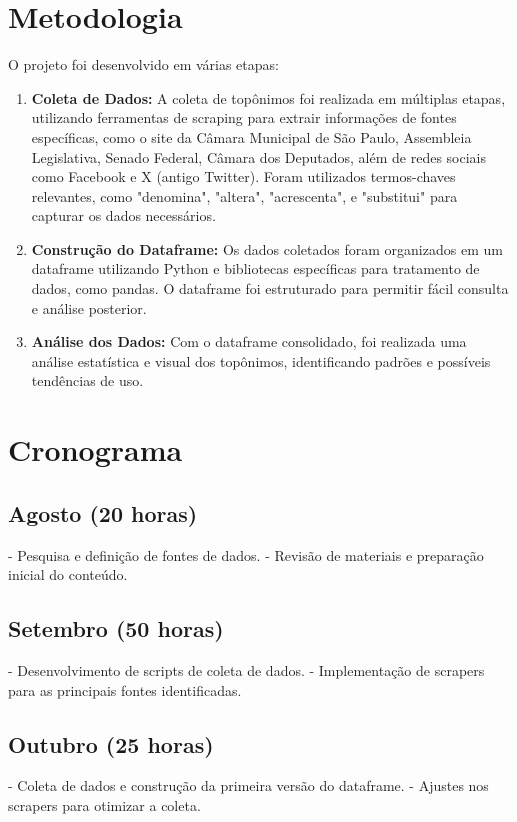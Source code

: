 \documentclass{article}
\begin{document}
\section*{Metodologia}
O projeto foi desenvolvido em várias etapas:
\begin{enumerate}
    \item \textbf{Coleta de Dados:} A coleta de topônimos foi realizada em múltiplas etapas, utilizando ferramentas de scraping para extrair informações de fontes específicas, como o site da Câmara Municipal de São Paulo, Assembleia Legislativa, Senado Federal, Câmara dos Deputados, além de redes sociais como Facebook e X (antigo Twitter). Foram utilizados termos-chaves relevantes, como "denomina", "altera", "acrescenta", e "substitui" para capturar os dados necessários.
    \item \textbf{Construção do Dataframe:} Os dados coletados foram organizados em um dataframe utilizando Python e bibliotecas específicas para tratamento de dados, como pandas. O dataframe foi estruturado para permitir fácil consulta e análise posterior.
    \item \textbf{Análise dos Dados:} Com o dataframe consolidado, foi realizada uma análise estatística e visual dos topônimos, identificando padrões e possíveis tendências de uso.
\end{enumerate}

\section*{Cronograma}
\subsection*{Agosto (20 horas)}
- Pesquisa e definição de fontes de dados.
- Revisão de materiais e preparação inicial do conteúdo.

\subsection*{Setembro (50 horas)}
- Desenvolvimento de scripts de coleta de dados.
- Implementação de scrapers para as principais fontes identificadas.

\subsection*{Outubro (25 horas)}
- Coleta de dados e construção da primeira versão do dataframe.
- Ajustes nos scrapers para otimizar a coleta.
\end{document}
